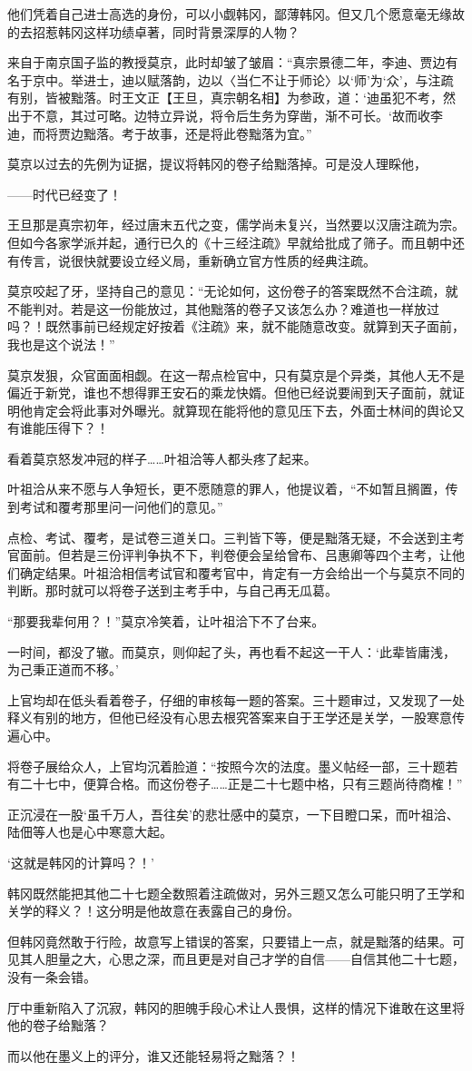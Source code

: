 他们凭着自己进士高选的身份，可以小觑韩冈，鄙薄韩冈。但又几个愿意毫无缘故的去招惹韩冈这样功绩卓著，同时背景深厚的人物？

来自于南京国子监的教授莫京，此时却皱了皱眉：“真宗景德二年，李迪、贾边有名于京中。举进士，迪以赋落韵，边以〈当仁不让于师论〉以‘师'为‘众'，与注疏有别，皆被黜落。时王文正【王旦，真宗朝名相】为参政，道：‘迪虽犯不考，然出于不意，其过可略。边特立异说，将令后生务为穿凿，渐不可长。‘故而收李迪，而将贾边黜落。考于故事，还是将此卷黜落为宜。”

莫京以过去的先例为证据，提议将韩冈的卷子给黜落掉。可是没人理睬他，

——时代已经变了！

王旦那是真宗初年，经过唐末五代之变，儒学尚未复兴，当然要以汉唐注疏为宗。但如今各家学派并起，通行已久的《十三经注疏》早就给批成了筛子。而且朝中还有传言，说很快就要设立经义局，重新确立官方性质的经典注疏。

莫京咬起了牙，坚持自己的意见：“无论如何，这份卷子的答案既然不合注疏，就不能判对。若是这一份能放过，其他黜落的卷子又该怎么办？难道也一样放过吗？！既然事前已经规定好按着《注疏》来，就不能随意改变。就算到天子面前，我也是这个说法！”

莫京发狠，众官面面相觑。在这一帮点检官中，只有莫京是个异类，其他人无不是偏近于新党，谁也不想得罪王安石的乘龙快婿。但他已经说要闹到天子面前，就证明他肯定会将此事对外曝光。就算现在能将他的意见压下去，外面士林间的舆论又有谁能压得下？！

看着莫京怒发冲冠的样子……叶祖洽等人都头疼了起来。

叶祖洽从来不愿与人争短长，更不愿随意的罪人，他提议着，“不如暂且搁置，传到考试和覆考那里问一问他们的意见。”

点检、考试、覆考，是试卷三道关口。三判皆下等，便是黜落无疑，不会送到主考官面前。但若是三份评判争执不下，判卷便会呈给曾布、吕惠卿等四个主考，让他们确定结果。叶祖洽相信考试官和覆考官中，肯定有一方会给出一个与莫京不同的判断。那时就可以将卷子送到主考手中，与自己再无瓜葛。

“那要我辈何用？！”莫京冷笑着，让叶祖洽下不了台来。

一时间，都没了辙。而莫京，则仰起了头，再也看不起这一干人：‘此辈皆庸浅，为己秉正道而不移。’

上官均却在低头看着卷子，仔细的审核每一题的答案。三十题审过，又发现了一处释义有别的地方，但他已经没有心思去根究答案来自于王学还是关学，一股寒意传遍心中。

将卷子展给众人，上官均沉着脸道：“按照今次的法度。墨义帖经一部，三十题若有二十七中，便算合格。而这份卷子……正是二十七题中格，只有三题尚待商榷！”

正沉浸在一股‘虽千万人，吾往矣’的悲壮感中的莫京，一下目瞪口呆，而叶祖洽、陆佃等人也是心中寒意大起。

‘这就是韩冈的计算吗？！’

韩冈既然能把其他二十七题全数照着注疏做对，另外三题又怎么可能只明了王学和关学的释义？！这分明是他故意在表露自己的身份。

但韩冈竟然敢于行险，故意写上错误的答案，只要错上一点，就是黜落的结果。可见其人胆量之大，心思之深，而且更是对自己才学的自信——自信其他二十七题，没有一条会错。

厅中重新陷入了沉寂，韩冈的胆魄手段心术让人畏惧，这样的情况下谁敢在这里将他的卷子给黜落？

而以他在墨义上的评分，谁又还能轻易将之黜落？！

